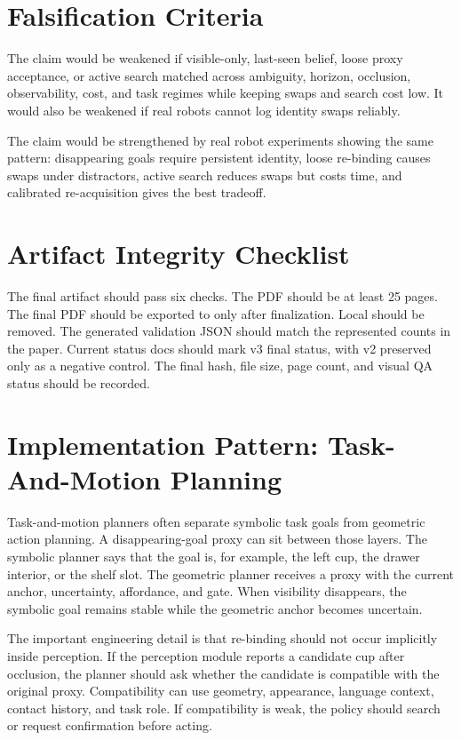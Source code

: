 \section{Falsification Criteria}

The claim would be weakened if visible-only, last-seen belief, loose proxy acceptance, or active search matched \method across ambiguity, horizon, occlusion, observability, cost, and task regimes while keeping swaps and search cost low. It would also be weakened if real robots cannot log identity swaps reliably.

The claim would be strengthened by real robot experiments showing the same pattern: disappearing goals require persistent identity, loose re-binding causes swaps under distractors, active search reduces swaps but costs time, and calibrated re-acquisition gives the best tradeoff.

\section{Artifact Integrity Checklist}

The final artifact should pass six checks. The PDF should be at least 25 pages. The final PDF should be exported to  only after finalization. Local  should be removed. The generated validation JSON should match the represented counts in the paper. Current status docs should mark v3 final status, with v2 preserved only as a negative control. The final hash, file size, page count, and visual QA status should be recorded.

\section{Implementation Pattern: Task-And-Motion Planning}

Task-and-motion planners often separate symbolic task goals from geometric action planning. A disappearing-goal proxy can sit between those layers. The symbolic planner says that the goal is, for example, the left cup, the drawer interior, or the shelf slot. The geometric planner receives a proxy with the current anchor, uncertainty, affordance, and gate. When visibility disappears, the symbolic goal remains stable while the geometric anchor becomes uncertain.

The important engineering detail is that re-binding should not occur implicitly inside perception. If the perception module reports a candidate cup after occlusion, the planner should ask whether the candidate is compatible with the original proxy. Compatibility can use geometry, appearance, language context, contact history, and task role. If compatibility is weak, the policy should search or request confirmation before acting.

